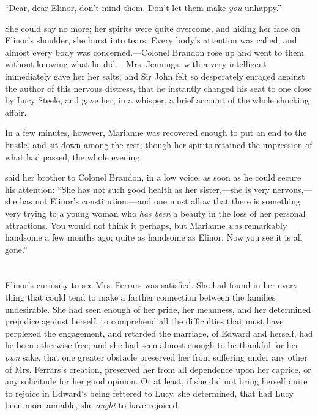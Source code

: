 “Dear, dear Elinor, don't mind them. Don't let them make {\em you} unhappy.”

She could say no more; her spirits were quite overcome, and hiding her face on Elinor's shoulder, she burst into tears. Every body's attention was called, and almost every body was concerned.---Colonel Brandon rose up and went to them without knowing what he did.---Mrs. Jennings, with a very intelligent  immediately gave her her salts; and Sir John felt so desperately enraged against the author of this nervous distress, that he instantly changed his seat to one close by Lucy Steele, and gave her, in a whisper, a brief account of the whole shocking affair.

In a few minutes, however, Marianne was recovered enough to put an end to the bustle, and sit down among the rest; though her spirits retained the impression of what had passed, the whole evening.

 said her brother to Colonel Brandon, in a low voice, as soon as he could secure his attention: “She has not such good health as her sister,---she is very nervous,---she has not Elinor's constitution;---and one must allow that there is something very trying to a young woman who {\em has been} a beauty in the loss of her personal attractions. You would not think it perhaps, but Marianne {\em was} remarkably handsome a few months ago; quite as handsome as Elinor. Now you see it is all gone.”

\chapter{} %

Elinor's curiosity to see Mrs. Ferrars was satisfied. She had found in her every thing that could tend to make a farther connection between the families undesirable. She had seen enough of her pride, her meanness, and her determined prejudice against herself, to comprehend all the difficulties that must have perplexed the engagement, and retarded the marriage, of Edward and herself, had he been otherwise free; and she had seen almost enough to be thankful for her {\em own} sake, that one greater obstacle preserved her from suffering under any other of Mrs. Ferrars's creation, preserved her from all dependence upon her caprice, or any solicitude for her good opinion. Or at least, if she did not bring herself quite to rejoice in Edward's being fettered to Lucy, she determined, that had Lucy been more amiable, she {\em ought} to have rejoiced.

